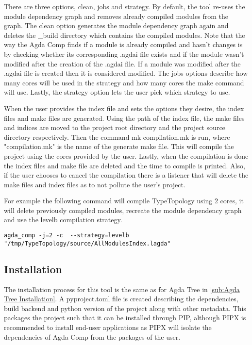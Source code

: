 There are three options, clean, jobs and strategy. By default, the tool re-uses
the module dependency graph and removes already compiled modules from the
graph. The clean option generates the module dependency graph again and deletes
the \_build directory which contains the compiled modules. Note that the way the
Agda Comp finds if a module is already compiled and hasn't changes is by
checking whether its corresponding .agdai file exists and if the module
wasn't modified after the creation of the .agdai file. If a module was modified
after the .agdai file is created then it is considered modified. The jobs
options describe how many cores will be used in the strategy and how many cores
the make command will use. Lastly, the strategy option lets the user pick which
strategy to use.

When the user provides the index file and sets the options they desire, the
index files and make files are generated. Using the path of the index file, the
make files and indices are moved to the project root directory and the project
source directory respectively. Then the command \textsf{mk compilation.mk} is
run, where "compilation.mk" is the name of the generate make file. This will
compile the project using the cores provided by the user. Lastly, when the
compilation is done the index files and make file are deleted and the time to
compile is printed. Also, if the user chooses to cancel the compilation there
is a listener that will delete the make files and index files as to not pollute
the user's project.

For example the following command will compile TypeTopology using 2 cores, it
will delete previously compiled modules, recreate the module dependency graph
and use the levelb compilation strategy.

\begin{lstlisting}
agda_comp -j=2 -c  --strategy=levelb "/tmp/TypeTopology/source/AllModulesIndex.lagda"
\end{lstlisting}

\subsection{Installation}

The installation process for this tool is the same as for Agda Tree in 
\cref{sub:Agda Tree Installation}. A pyproject.toml file is created describing
the dependencies, build backend and python version of the project along with
other metadata. This packages the project such that it can be installed through
PIP, although PIPX is recommended to install end-user applications as PIPX will
isolate the dependencies of Agda Comp from the packages of the user.

